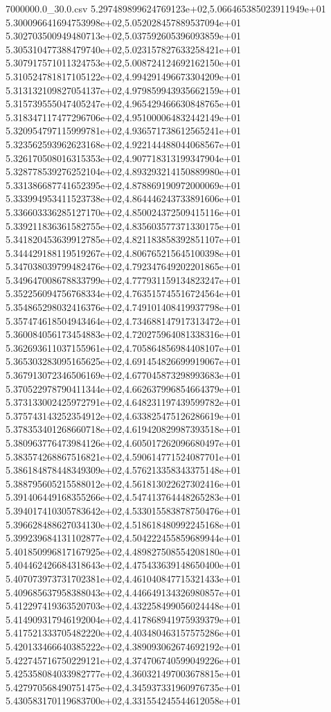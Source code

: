 \begin{filecontents*}{7000000.0_30.0.csv}
5.297489899624769123e+02,5.066465385023911949e+01
5.300096641694753998e+02,5.052028457889537094e+01
5.302703500949480713e+02,5.037592605396093859e+01
5.305310477388479740e+02,5.023157827633258421e+01
5.307917571011324753e+02,5.008724124692162150e+01
5.310524781817105122e+02,4.994291496673304209e+01
5.313132109827054137e+02,4.979859943935662159e+01
5.315739555047405247e+02,4.965429466630848765e+01
5.318347117477296706e+02,4.951000064832442149e+01
5.320954797115999781e+02,4.936571738612565241e+01
5.323562593962623168e+02,4.922144488044068567e+01
5.326170508016315353e+02,4.907718313199347904e+01
5.328778539276252104e+02,4.893293214150889980e+01
5.331386687741652395e+02,4.878869190972000069e+01
5.333994953411523738e+02,4.864446243733891606e+01
5.336603336285127170e+02,4.850024372509415116e+01
5.339211836361582755e+02,4.835603577371330175e+01
5.341820453639912785e+02,4.821183858392851107e+01
5.344429188119519267e+02,4.806765215645100398e+01
5.347038039799482476e+02,4.792347649202201865e+01
5.349647008678833799e+02,4.777931159134823247e+01
5.352256094756768334e+02,4.763515745516724564e+01
5.354865298032416376e+02,4.749101408419937798e+01
5.357474618504943464e+02,4.734688147917313472e+01
5.360084056173454883e+02,4.720275964081338316e+01
5.362693611037155961e+02,4.705864856984408107e+01
5.365303283095165625e+02,4.691454826699919067e+01
5.367913072346506169e+02,4.677045873298993683e+01
5.370522978790411344e+02,4.662637996854664379e+01
5.373133002425972791e+02,4.648231197439599782e+01
5.375743143252354912e+02,4.633825475126286619e+01
5.378353401268660718e+02,4.619420829987393518e+01
5.380963776473984126e+02,4.605017262096680497e+01
5.383574268867516821e+02,4.590614771524087701e+01
5.386184878448349309e+02,4.576213358343375148e+01
5.388795605215588012e+02,4.561813022627302416e+01
5.391406449168355266e+02,4.547413764448265283e+01
5.394017410305783642e+02,4.533015583878750476e+01
5.396628488627034130e+02,4.518618480992245168e+01
5.399239684131102877e+02,4.504222455859689944e+01
5.401850996817167925e+02,4.489827508554208180e+01
5.404462426684318643e+02,4.475433639148650400e+01
5.407073973731702381e+02,4.461040847715321433e+01
5.409685637958388043e+02,4.446649134326980857e+01
5.412297419363520703e+02,4.432258499056024448e+01
5.414909317946192004e+02,4.417868941975939379e+01
5.417521333705482220e+02,4.403480463157575286e+01
5.420133466640385222e+02,4.389093062674692192e+01
5.422745716750229121e+02,4.374706740599049226e+01
5.425358084033982777e+02,4.360321497003678815e+01
5.427970568490751475e+02,4.345937331960976735e+01
5.430583170119683700e+02,4.331554245544612058e+01

\end{filecontents*}
